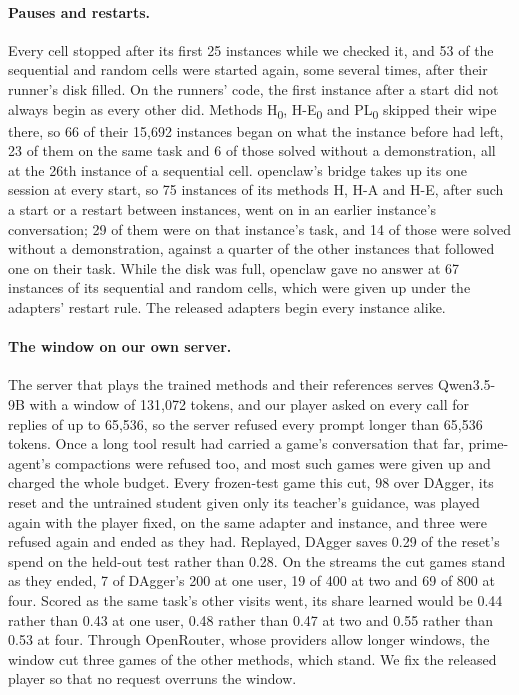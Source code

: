 \paragraph{Pauses and restarts.} Every cell stopped after its first 25 instances while we checked it, and 53 of the sequential and random cells were started again, some several times, after their runner's disk filled. On the runners' code, the first instance after a start did not always begin as every other did. Methods H\textsubscript{0}, H-E\textsubscript{0} and PL\textsubscript{0} skipped their wipe there, so 66 of their 15{,}692 instances began on what the instance before had left, 23 of them on the same task and 6 of those solved without a demonstration, all at the 26th instance of a sequential cell. openclaw's bridge takes up its one session at every start, so 75 instances of its methods H, \mbox{H-A} and \mbox{H-E}, after such a start or a restart between instances, went on in an earlier instance's conversation; 29 of them were on that instance's task, and 14 of those were solved without a demonstration, against a quarter of the other instances that followed one on their task. While the disk was full, openclaw gave no answer at 67 instances of its sequential and random cells, which were given up under the adapters' restart rule. The released adapters begin every instance alike.

\paragraph{The window on our own server.} The server that plays the trained methods and their references serves Qwen3.5-9B with a window of 131{,}072 tokens, and our player asked on every call for replies of up to 65{,}536, so the server refused every prompt longer than 65{,}536 tokens. Once a long tool result had carried a game's conversation that far, prime-agent's compactions were refused too, and most such games were given up and charged the whole budget. Every frozen-test game this cut, 98 over DAgger, its reset and the untrained student given only its teacher's guidance, was played again with the player fixed, on the same adapter and instance, and three were refused again and ended as they had. Replayed, DAgger saves 0.29 of the reset's spend on the held-out test rather than 0.28. On the streams the cut games stand as they ended, 7 of DAgger's 200 at one user, 19 of 400 at two and 69 of 800 at four. Scored as the same task's other visits went, its share learned would be 0.44 rather than 0.43 at one user, 0.48 rather than 0.47 at two and 0.55 rather than 0.53 at four. Through OpenRouter, whose providers allow longer windows, the window cut three games of the other methods, which stand. We fix the released player so that no request overruns the window.

